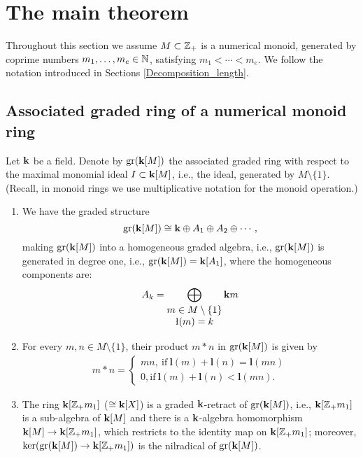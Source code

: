 \chapter{The main theorem}

\label{main_result}

Throughout this section we assume $M\subset\mathbb Z_+$ is a numerical monoid, generated by coprime numbers $m_1,\ldots,m_e\in\mathbb N$, satisfying $m_1 < \cdots < m_e$. We follow the notation introduced in Sections \ref{Decomposition_length}.

\section{Associated graded ring of a numerical monoid ring}

Let $\mathbf{k}$ be a field. Denote by $\operatorname{gr}(\mathbf{k}[M])$ the associated graded ring with respect to the maximal monomial ideal $I\subset\mathbf{k}[M]$, i.e., the ideal, generated by $M\setminus\{1\}$. (Recall, in monoid rings we use multiplicative notation for the monoid operation.)

\newpage

\begin{proposition}\label{associated}
\leavevmode
\begin{enumerate}[label=(\alph*)]
\item
We have the graded structure
$$
\operatorname{gr}(\mathbf{k}[M])\cong\mathbf{k}\oplus A_1\oplus A_2\oplus\cdots,
$$
making $\operatorname{gr}(\mathbf{k}[M])$ into a homogeneous graded algebra, i.e., $\operatorname{gr}(\mathbf{k}[M])$ is generated in degree one, i.e., $\operatorname{gr}(\mathbf{k}[M])=\mathbf{k}[A_1]$, where the homogeneous components are:
\begin{align*}
A_k=\bigoplus_{
{
\begin{matrix}
m\in M\setminus\{1\}\\
\l(m)=k
\end{matrix}
}
}
\kk m
\end{align*}
\item For every $m,n\in M\setminus\{1\}$, their product $m*n$ in $\operatorname{gr}(\mathbf{k}[M])$ is given by
\begin{align*}
m*n=
\begin{cases}
mn,\ \text{if}\ \textbf{l}(m)+\textbf{l}(n)=\textbf{l}(mn)\\
0, \text{if}\ \textbf{l}(m)+\textbf{l}(n)<\textbf{l}(mn).
\end{cases}
\end{align*}
\item The ring $\mathbf{k}[\mathbb Z_+m_1]$ ($\cong\mathbf{k}[X]$) is a graded $\mathbf{k}$-retract of $\operatorname{gr}(\mathbf{k}[M])$, i.e., $\mathbf{k}[\mathbb Z_+m_1]$ is a sub-algebra of $\mathbf{k}[M]$ and there is a $\mathbf{k}$-algebra homomorphism $\mathbf{k}[M]\to\mathbf{k}[\mathbb Z_+m_1]$, which restricts  to the identity map on $\mathbf{k}[\mathbb Z_+m_1]$; moreover, $\ker(\operatorname{gr}(\mathbf{k}[M])\to\mathbf{k}[\mathbb Z_+m_1])$ is the nilradical of $\operatorname{gr}(\mathbf{k}[M])$.
\end{enumerate}
\end{proposition}
 
